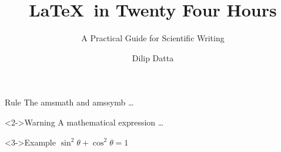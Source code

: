 \documentclass{beamer}
\title[\LaTeX\ in 24H]{\LaTeX\ in Twenty Four Hours}
\subtitle{A Practical Guide for Scientific Writing}
\author[D. Datta]{Dilip Datta}
\begin{document}
    \begin{frame}[t]
        \begin{block}{Rule}
            The amsmath and amssymb …
        \end{block}
        \begin{alertblock}<2->{Warning}
        A mathematical expression …
        \end{alertblock}
        \begin{exampleblock}<3->{Example}
        $\sin^2\theta + \cos^2\theta = 1$
        \end{exampleblock}
    \end{frame}
\end{document}

